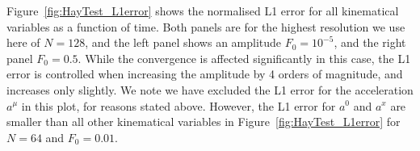 \documentclass[a4paper]{article}
\begin{document}
Figure~\ref{fig:HayTest_L1error} shows the normalised L1 error for all kinematical variables as a function of time. Both panels are for the highest resolution we use here of $N=128$, and the left panel shows an amplitude $F_0=10^{-5}$, and the right panel $F_0=0.5$. While the convergence is affected significantly in this case, the L1 error is controlled when increasing the amplitude by 4 orders of magnitude, and increases only slightly. We note we have excluded the L1 error for the acceleration $a^\mu$ in this plot, for reasons stated above. However, the L1 error for $a^0$ and $a^x$ are smaller than all other kinematical variables in Figure~\ref{fig:HayTest_L1error} for $N=64$ and $F_0=0.01$.






%

\end{document}
